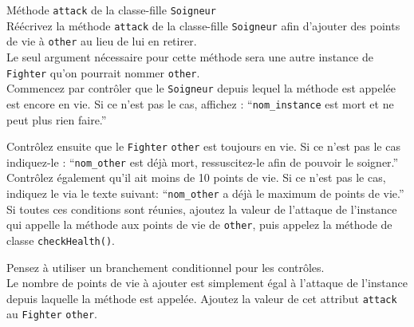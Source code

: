 \begin{Exercice}[10 minutes] Méthode \lstinline{attack} de la classe-fille \lstinline{Soigneur} \\

Réécrivez la méthode \lstinline{attack} de la classe-fille \lstinline{Soigneur} afin d'ajouter des points de vie à \lstinline{other} au lieu de lui en retirer. \\

Le seul argument nécessaire pour cette méthode sera une autre instance de \lstinline{Fighter} qu'on pourrait nommer \lstinline{other}. \\

Commencez par contrôler que le \lstinline{Soigneur} depuis lequel la méthode est appelée est encore en vie. Si ce n'est pas le cas, affichez : ``\lstinline{nom_instance} est mort et ne peut plus rien faire.''

Contrôlez ensuite que le \lstinline{Fighter} \lstinline{other} est toujours en vie. Si ce n'est pas le cas indiquez-le : ``\lstinline{nom_other} est déjà mort, ressuscitez-le afin de pouvoir le soigner.'' Contrôlez également qu'il ait moins de 10 points de vie. Si ce n'est pas le cas, indiquez le via le texte suivant: ``\lstinline{nom_other} a déjà le maximum de points de vie.'' \\

Si toutes ces conditions sont réunies, ajoutez la valeur de l'attaque de l'instance qui appelle la méthode aux points de vie de \lstinline{other}, puis appelez la méthode de classe \lstinline{checkHealth()}.

\begin{conseil}
Pensez à utiliser un branchement conditionnel pour les contrôles. \\

Le nombre de points de vie à ajouter est simplement égal à l'attaque de l'instance depuis laquelle la méthode est appelée. Ajoutez la valeur de cet attribut \lstinline{attack} au \lstinline{Fighter} \lstinline{other}.

\end{conseil}

\begin{solution}
	
\end{solution}

\end{Exercice}

